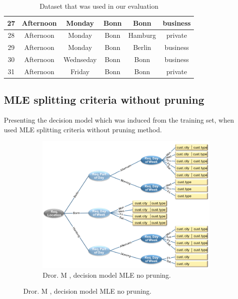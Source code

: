 \documentclass[a4paper,12pt]{article}
\begin{document}
\begin{spacing}{1.5}
\begin{table}[h]
\begin{tabular}{|c|c|c|c|c|c|}
27         & Afternoon           & Monday              & Bonn             & Bonn          & business      \\\hline
28         & Afternoon           & Monday              & Bonn             & Hamburg       & private       \\\hline
29         & Afternoon           & Monday              & Bonn             & Berlin        & business      \\\hline
30         & Afternoon           & Wednseday           & Bonn             & Bonn          & business      \\\hline
31         & Afternoon           & Friday              & Bonn             & Bonn          & private       \\\hline

\end{tabular}
\caption{Dataset that was used in our evaluation}
\label{ref:datatable}
\end{table}



\clearpage
\subsection{MLE splitting criteria without pruning}
Presenting the decision model which was induced from the training set, when used MLE splitting criteria without pruning method.

\begin{figure}[!h]
  \centering
  \begin{subfigure}[!h]{1\textwidth}
  \includegraphics[width=1\textwidth]{Figures/Eval/MaayanMLEnoP}
  \caption{Dror. M \cite{dror2011thesis}, decision model MLE no pruning.}
\end{subfigure}


\end{figure}
\end{spacing}
\end{document}
